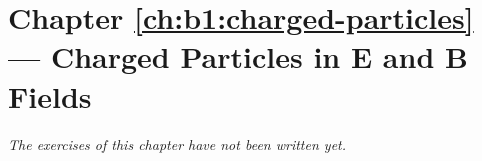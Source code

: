 \section*{Chapter \ref{ch:b1:charged-particles} --- Charged Particles in E and B Fields}


\emph{The exercises of this chapter have not been written yet.}
